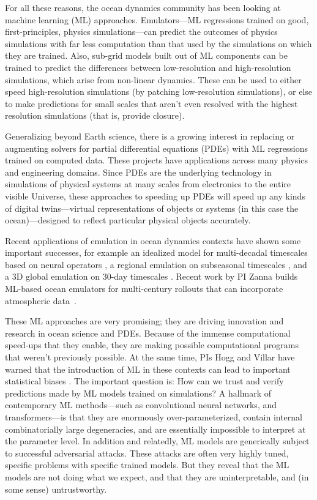 \documentclass[11pt]{article}
\begin{document}
For all these reasons, the ocean dynamics community has been looking at machine learning (ML) approaches.
Emulators---ML regressions trained on good, first-principles, physics simulations---can predict the outcomes of physics simulations with far less computation than that used by the simulations on which they are trained.
Also, sub-grid models built out of ML components can be trained to predict the differences between low-resolution and high-resolution simulations, which arise from non-linear dynamics.
These can be used to either speed high-resolution simulations (by patching low-resolution simulations), or else to make predictions for small scales that aren't even resolved with the highest resolution simulations (that is, provide closure).

Generalizing beyond Earth science, there is a growing interest in replacing or augmenting solvers for partial differential equations (PDEs) with ML regressions trained on computed data.
These projects have applications across many physics and engineering domains.
Since PDEs are the underlying technology in simulations of physical systems at many scales from electronics to the entire visible Universe,
these approaches to speeding up PDEs will speed up any kinds of digital twins---virtual representations of objects or systems (in this case the ocean)---designed to reflect particular physical objects accurately.

Recent applications of emulation in ocean dynamics contexts have shown some important successes, for example
an idealized model for multi-decadal timescales based on neural operators \cite{bire2023ocean}, a regional emulation on subseasonal timescales 
\cite{chattopadhyay2023oceannet}, and a 3D global emulation on 30-day timescales
\cite{xiong2023ai}.
Recent work by PI Zanna builds ML-based ocean emulators for multi-century rollouts that can incorporate atmospheric data~\cite{subel2024building, thermalizer,samudra2005}. 

These ML approaches are very promising; they are driving innovation and research in ocean science and PDEs.
Because of the immense computational speed-ups that they enable, they are making possible computational programs that weren't previously possible.
At the same time, PIs Hogg and Villar have warned that the introduction of ML in these contexts can lead to important statistical biases \cite{goodorbad}.
The important question is: How can we trust and verify predictions made by ML models trained on simulations?
A hallmark of contemporary ML methods---such as convolutional neural networks, and transformers---is that they are enormously over-parameterized, contain internal combinatorially large degeneracies, and are essentially impossible to interpret at the parameter level.
In addition and relatedly, ML models are generically subject to successful adversarial attacks.
These attacks are often very highly tuned, specific problems with specific trained models.
But they reveal that the ML models are not doing what we expect, and that they are uninterpretable, and (in some sense) untrustworthy.
\end{document}
